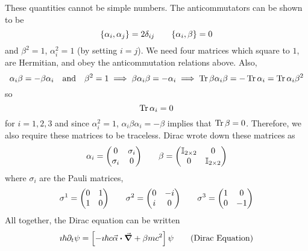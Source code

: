 \documentclass[a4paper,twoside,master.tex]{subfiles}
\begin{document}
These quantities cannot be simple numbers. The anticommutators can be shown to be
\begin{equation}
    \pb{\alpha_i}{\alpha_j} = 2 \delta_{ij} \qquad \pb{\alpha_i}{\beta} = 0
\end{equation}
and $ \beta^2 = 1 $, $ \alpha_i^2 = 1 $ (by setting $ i = j $).
We need four matrices which square to $ 1 $, are Hermitian, and obey the anticommutation relations above. Also,
\begin{equation}
    \alpha_i \beta = - \beta \alpha_i \qand \beta^2 = 1 \implies \beta \alpha_i \beta = - \alpha_i \implies \Tr \beta \alpha_i \beta = - \Tr \alpha_i = \Tr \alpha_i \beta^2
\end{equation}
so
\begin{equation}
    \Tr \alpha_i = 0
\end{equation}
for $ i = 1,2,3 $ and since $ \alpha_i^2 = 1 $, $ \alpha_i \beta \alpha_i = - \beta $ implies that $ \Tr \beta = 0 $. Therefore, we also require these matrices to be traceless. Dirac wrote down these matrices as
\begin{equation}
    \alpha_i = \mqty(0 & \sigma_i \\ \sigma_i & 0) \qquad \beta = \mqty(\mathbb{I}_{2\times 2} & 0 \\ 0 & \mathbb{I}_{2 \times 2})
\end{equation}
where $ \sigma_i $ are the Pauli matrices,
\begin{equation}
    \sigma^1 = \mqty(\pmat{1}) \qquad \sigma^2 = \mqty(\pmat{2}) \qquad \sigma^3 = \mqty(\pmat{3})
\end{equation}
All together, the Dirac equation can be written
\begin{equation}
    \imath \hbar \partial_t \psi = \left[ - \imath \hbar c \va{\alpha} \vdot \grad + \beta m c^2 \right] \psi \tag{Dirac Equation}
\end{equation}
\end{document}
